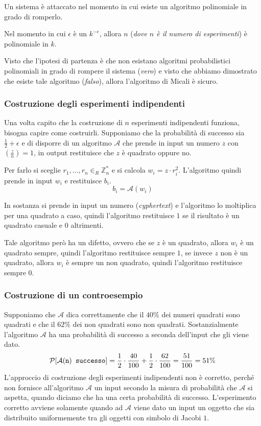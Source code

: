 Un sistema è attaccato nel momento in cui esiste un algoritmo polinomiale in 
grado di romperlo.

Nel momento in cui $\epsilon$ è un $k^{-c}$, allora $n$ (\textit{dove $n$ è il numero di
esperimenti}) è polinomiale in $k$.

Visto che l'ipotesi di partenza è che non esistano algoritmi probabilistici polinomiali in grado
di rompere il sistema (\textit{vero}) e visto che abbiamo dimostrato che esiste tale algoritmo (\textit{falso}), allora
l'algoritmo di Micali è sicuro.
\subsubsection{Costruzione degli esperimenti indipendenti}

Una volta capito che la costruzione di $n$ esperimenti indipendenti funziona, bisogna 
capire come costruirli. Supponiamo che la probabilità di successo sia $\frac{1}{2} + \epsilon$ e
di disporre di un algoritmo $\mathcal{A}$ che prende in input un numero $z$ 
con $\left(\frac{z}{n}\right) = 1$, in output restituisce che $z$ è quadrato oppure no.

Per farlo si sceglie $r_1, \dots, r_n \in_R \mathbb{Z}_n^*$ e
si calcola $w_i = z \cdot r_i^2$. L'algoritmo quindi prende in input $w_i$ e restituisce
$b_i$.
\[
  b_i = \mathcal{A}(w_i)
\]

In sostanza si prende in input un numero (\textit{cyphertext}) e l'algoritmo lo moltiplica per una 
quadrato a caso, quindi l'algoritmo restituisce $1$ se il risultato è un quadrato casuale e $0$
altrimenti.

Tale algoritmo però ha un difetto, ovvero che se $z$ è un quadrato, allora $w_i$ è un quadrato
sempre, quindi l'algoritmo restituisce sempre $1$, se invece $z$ non è un quadrato, allora
$w_i$ è sempre un non quadrato, quindi l'algoritmo restituisce sempre $0$.
\subsubsection{Costruzione di un controesempio}
Supponiamo che $\mathcal{A}$ dica correttamente che il $40\%$ dei numeri quadrati sono quadrati e 
che il $62\%$ dei non quadrati sono non quadrati. Sostanzialmente l'algoritmo $\mathcal{A}$
ha una probabilità di successo a seconda dell'input che gli viene dato. 
\[
  \text{$\mathcal{P}$}[\mathcal{A}(\texttt{n})\texttt{ successo}] = \frac{1}{2} \cdot \frac{40}{100} + 
  \frac{1}{2} \cdot \frac{62}{100} = \frac{51}{100} = 51\%
\]
L'approccio di costruzione degli esperimenti indipendenti non è corretto, perché 
non fornisce all'algoritmo $\mathcal{A}$ un input secondo la misura di probabilità
che $\mathcal{A}$ si aspetta, quando diciamo che ha una certa probabilità di successo.
L'esperimento corretto avviene solamente quando ad $\mathcal{A}$ viene dato un input
un oggetto che sia distribuito uniformemente tra gli oggetti con simbolo di Jacobi $1$.
